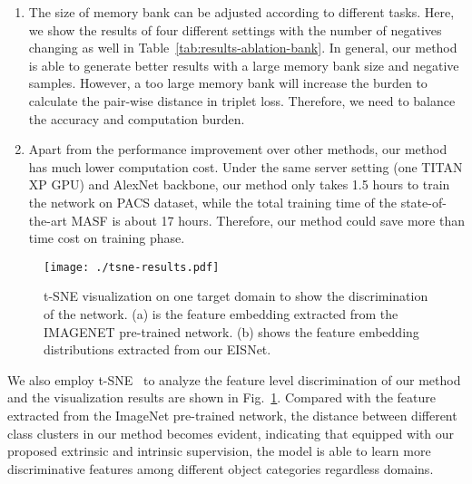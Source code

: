 \begin{enumerate}
	\item The size of memory bank  can be adjusted according to different tasks. Here, we show the results of four different settings with the number of negatives changing as well in Table~\ref{tab:results-ablation-bank}. 
In general, our method is able to generate better results with a large memory bank size and negative samples.
However, a too large memory bank will increase the burden to calculate the pair-wise distance in triplet loss.
	Therefore, we need to balance the accuracy and computation burden.
	\item Apart from the performance improvement over other methods, our method has much lower computation cost. Under the same server setting (one TITAN XP GPU) and AlexNet backbone, our method only takes 1.5 hours to train the network on PACS dataset, while the total training time of the state-of-the-art MASF is about 17 hours. Therefore, our method could save more than  time cost on training phase.
\end{enumerate}





\begin{figure}[!t]
	\centering
	\texttt{[image: ./tsne-results.pdf]}
	\caption{
		t-SNE visualization on one target domain to show the discrimination of the network. (a) is the feature embedding extracted from the IMAGENET pre-trained network. (b) shows the feature embedding distributions extracted from our EISNet.
	}
	\label{fig:tsne}
\end{figure}

We also employ t-SNE~\cite{maaten2008visualizing} to analyze the feature level discrimination of our method and the visualization results are shown in Fig.~\ref{fig:tsne}.
Compared with the feature extracted from the ImageNet pre-trained network, the distance between different class clusters in our method becomes evident, indicating that equipped with our proposed extrinsic and intrinsic supervision, the model is able to learn more discriminative features among different object categories regardless domains.
